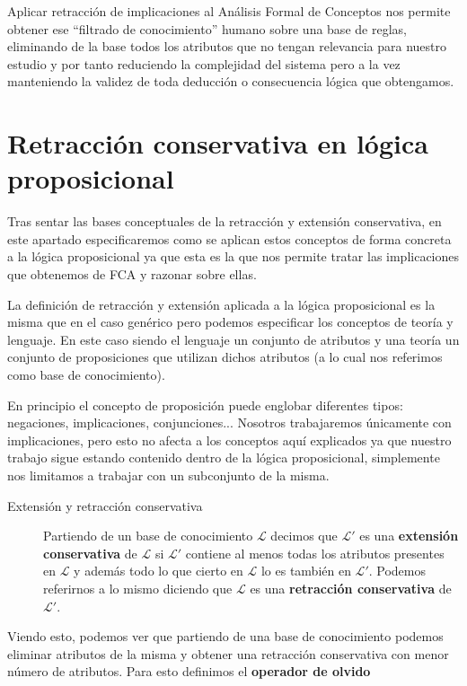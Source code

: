 	Aplicar retracción de implicaciones al Análisis Formal de Conceptos nos permite obtener ese ``filtrado de conocimiento'' humano sobre una base de reglas, eliminando de la base todos los atributos que no tengan relevancia para nuestro estudio y por tanto reduciendo la complejidad del sistema pero a la vez manteniendo la validez de toda deducción o consecuencia lógica que obtengamos.
	
	
\section*{Retracción conservativa en lógica proposicional}

	Tras sentar las bases conceptuales de la retracción y extensión conservativa, en este apartado especificaremos como se aplican estos conceptos de forma concreta a la lógica proposicional ya que esta es la que nos permite tratar las implicaciones que obtenemos de FCA y razonar sobre ellas.

	La definición de retracción y extensión aplicada a la lógica proposicional es la misma que en el caso genérico pero podemos especificar los conceptos de teoría y lenguaje. En este caso siendo el lenguaje un conjunto de atributos y una teoría un conjunto de proposiciones que utilizan dichos atributos (a lo cual nos referimos como base de conocimiento).
	
	En principio el concepto de proposición puede englobar diferentes tipos: negaciones, implicaciones, conjunciones... Nosotros trabajaremos únicamente con implicaciones, pero esto no afecta a los conceptos aquí explicados ya que nuestro trabajo sigue estando contenido dentro de la lógica proposicional, simplemente nos limitamos a trabajar con un subconjunto de la misma.
	
	\begin{description}
		\item[Extensión y retracción conservativa] 
			Partiendo de un base de conocimiento $\mathcal{L}$ decimos que $\mathcal{L'}$ es una \textbf{extensión conservativa} 
			de $\mathcal{L}$ si $\mathcal{L'}$ contiene al menos todas los atributos presentes en $\mathcal{L}$ y 
			además todo lo que cierto en $\mathcal{L}$ lo es también en $\mathcal{L'}$. Podemos referirnos a lo mismo 
			diciendo que $\mathcal{L}$ es una \textbf{retracción conservativa} de $\mathcal{L'}$. 
	\end{description}

	Viendo esto, podemos ver que partiendo de una base de conocimiento podemos eliminar atributos de la misma y obtener una retracción conservativa con menor número de atributos. Para esto definimos el \textbf{operador de olvido}
 	
